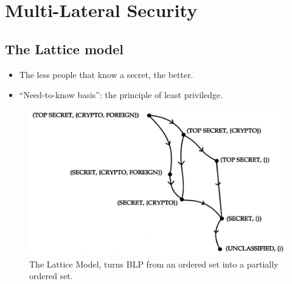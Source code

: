 \mode*




\section{Multi-Lateral Security}


\subsection{The Lattice model}

\begin{frame}
  \begin{idea}
    \begin{itemize}
      \item The less people that know a secret, the better.
      \item \enquote{Need-to-know basis}: the principle of least priviledge.
    \end{itemize}
  \end{idea}
\end{frame}

\begin{frame}
  \begin{figure}
    \includegraphics[height=0.6\textheight]{lattice.png}
    \caption{The Lattice Model, turns BLP from an ordered set into a partially 
      ordered set.}
  \end{figure}
\end{frame}

